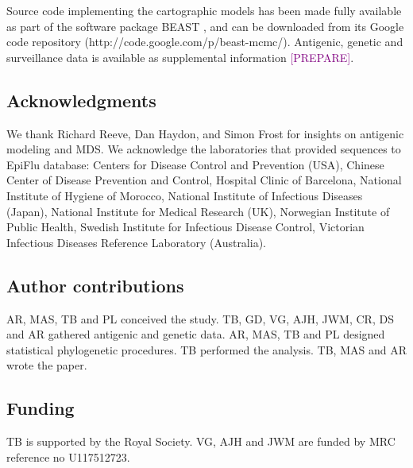 \documentclass[11pt,oneside,letterpaper]{article}
\def\tbc#1{\textcolor{purple}{[#1]}}
\begin{document}
Source code implementing the cartographic models has been made fully available as part of the software package BEAST \cite{BEAST, BEAST17}, and can be downloaded from its Google code repository (http://code.google.com/p/beast-mcmc/).
Antigenic, genetic and surveillance data is available as supplemental information \tbc{PREPARE}.

\subsection*{Acknowledgments} 

We thank Richard Reeve, Dan Haydon, and Simon Frost for insights on antigenic modeling and MDS.
We acknowledge the laboratories that provided sequences to EpiFlu database: Centers for Disease Control and Prevention (USA), Chinese Center of Disease Prevention and Control, Hospital Clinic of Barcelona, National Institute of Hygiene of Morocco, National Institute of Infectious Diseases (Japan), National Institute for Medical Research (UK), Norwegian Institute of Public Health, Swedish Institute for Infectious Disease Control, Victorian Infectious Diseases Reference Laboratory (Australia).

\subsection*{Author contributions} 

AR, MAS, TB and PL conceived the study.
TB, GD, VG, AJH, JWM, CR, DS and AR gathered antigenic and genetic data.
AR, MAS, TB and PL designed statistical phylogenetic procedures.
TB performed the analysis.
TB, MAS and AR wrote the paper.

\subsection*{Funding} 

TB is supported by the Royal Society. 
VG, AJH and JWM are funded by MRC reference no U117512723.




\pagebreak

\setcounter{figure}{0}
\setcounter{table}{0}
\renewcommand{\thefigure}{S\arabic{figure}}
\renewcommand{\thetable}{S\arabic{table}}

\end{document}
